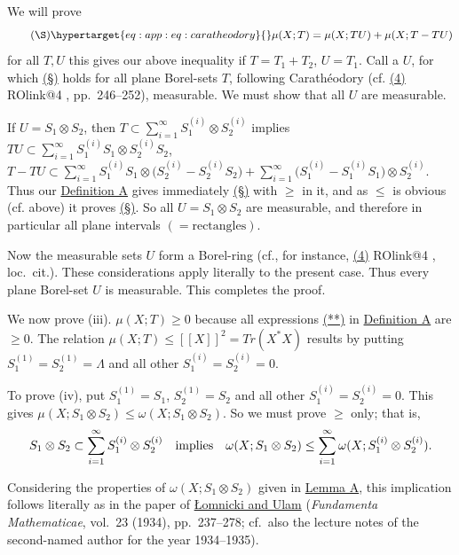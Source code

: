 \documentclass[twoside,leqno]{article}
\makeatletter
\newcommand{\Tr}{Tr}
\newcommand{\ROcite}[1]{%
  \@ifundefined{ROlink@#1}
    {\href{https://doi.org/10.2307/1968693}{(#1)}}
    {\csname ROlink@#1\endcsname{(#1)}}%
}
\newcommand{\StatementRef}[2]{\hyperlink{stmt:#1}{#2}}
\newcommand{\EquationTarget}[1]{\hypertarget{eq:#1}{}}
\newcommand{\EquationRef}[2]{\hyperlink{eq:#1}{#2}}
\makeatother
\begin{document}
We will prove
\[
 \tag{\S}\EquationTarget{app:eq:caratheodory}
 \mu(X;T)=\mu(X;TU)+\mu(X;T-TU)
\]
for all \(T,U\) this gives our above inequality if \(T=T_1+T_2\),
\(U=T_1\). Call a \(U\), for which
\EquationRef{app:eq:caratheodory}{(\S)} holds for all plane Borel-sets
\(T\), following Carath\'eodory (cf. \ROcite{4}, pp.\ 246--252), measurable.
We must show that all \(U\) are measurable.

If \(U=S_1\otimes S_2\), then
\(T\subset\sum_{i=1}^{\infty}S_1^{(i)}\otimes S_2^{(i)}\) implies
\(TU\subset\sum_{i=1}^{\infty}
S_1^{(i)}S_1\otimes S_2^{(i)}S_2\),
\(T-TU\subset\sum_{i=1}^{\infty}
S_1^{(i)}S_1\otimes\bigl(S_2^{(i)}-S_2^{(i)}S_2\bigr)
+\sum_{i=1}^{\infty}
\bigl(S_1^{(i)}-S_1^{(i)}S_1\bigr)\otimes S_2^{(i)}\).
Thus our \StatementRef{def:A}{Definition A} gives immediately
\EquationRef{app:eq:caratheodory}{(\S)} with \(\geq\) in it, and as
\(\leq\) is obvious (cf. above) it proves
\EquationRef{app:eq:caratheodory}{(\S)}. So all \(U=S_1\otimes S_2\) are
measurable, and therefore in particular all plane intervals
\((=\text{rectangles})\).

Now the measurable sets \(U\) form a Borel-ring (cf., for instance,
\ROcite{4}, loc.\ cit.). These considerations apply literally to the
present case. Thus every plane Borel-set \(U\) is measurable. This completes
the proof.

We now prove (iii). \(\mu(X;T)\geq0\) because all expressions
\EquationRef{app:eq:sum}{(**)} in \StatementRef{def:A}{Definition A} are
\(\geq0\). The relation
\(\mu(X;T)\leq[\![X]\!]^2=\Tr(X^*X)\) results by putting
\(S_1^{(1)}=S_2^{(1)}=\Lambda\) and all other
\(S_1^{(i)}=S_2^{(i)}=0\).

To prove (iv), put \(S_1^{(1)}=S_1\), \(S_2^{(1)}=S_2\) and all other
\(S_1^{(i)}=S_2^{(i)}=0\). This gives
\(\mu(X;S_1\otimes S_2)\leq\omega(X;S_1\otimes S_2)\). So we must
prove \(\geq\) only; that is,
\[
 S_1\otimes S_2
 \subset\sum_{i=1}^{\infty}S_1^{(i)}\otimes S_2^{(i)}
 \quad\hbox{implies}\quad
 \omega(X;S_1\otimes S_2)
 \leq\sum_{i=1}^{\infty}
 \omega(X;S_1^{(i)}\otimes S_2^{(i)}).
\]

Considering the properties of \(\omega(X;S_1\otimes S_2)\) given in
\StatementRef{lem:A}{Lemma A}, this implication follows literally as in
the paper of
\href{https://doi.org/10.4064/fm-23-1-237-278}{\L omnicki and Ulam}
(\textit{Fundamenta Mathematicae}, vol.\ 23 (1934), pp.\ 237--278; cf.\
also the lecture notes of the second-named author for the year 1934--1935).
\end{document}
